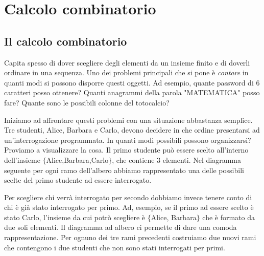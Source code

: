 
\chapter{Calcolo combinatorio}

\section{Il calcolo combinatorio}
\label{sec:01_introduzione}
Capita spesso di dover scegliere degli elementi da un insieme finito e di 
doverli ordinare in una sequenza. Uno dei problemi principali che si pone è 
\emph{contare} in quanti modi si possono disporre questi oggetti. Ad esempio, 
quante password di 6 caratteri posso ottenere? Quanti anagrammi della parola 
"MATEMATICA" posso fare? Quante sono le possibili colonne del totocalcio?

\vspace{7pt}

Iniziamo ad affrontare questi problemi con una situazione abbastanza semplice. 
Tre studenti, Alice, Barbara e Carlo, devono decidere in che ordine presentarsi 
ad un'interrogazione programmata.
In quanti modi possibili possono organizzarsi?
Proviamo a visualizzare la cosa. Il primo studente può essere scelto 
all'interno dell'insieme $\{$Alice,Barbara,Carlo$\}$, che contiene 3 elementi. Nel 
diagramma seguente per ogni ramo dell'albero abbiamo rappresentato una delle 
possibili scelte del primo studente ad essere interrogato.

\vspace{-6pt}
\begin{center}
\end{center}

\vspace{-6pt}
Per scegliere chi verrà interrogato per secondo dobbiamo invece tenere conto di 
chi è già stato interrogato per primo. Ad, esempio, se il primo ad essere 
scelto è stato Carlo, l'insieme da cui potrò scegliere è $\{$Alice, Barbara$\}$ 
che è formato da due soli elementi. Il diagramma ad albero ci permette di dare 
una comoda rappresentazione. Per ognuno dei tre rami precedenti costruiamo due 
nuovi rami che contengono i due studenti che non sono stati interrogati per 
primi.

